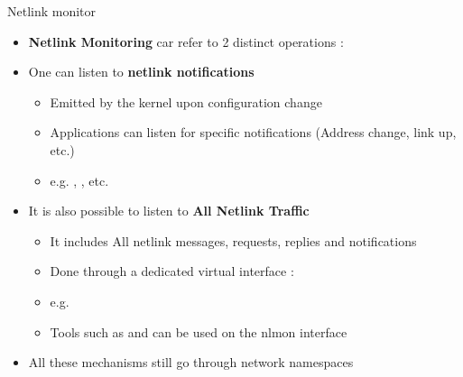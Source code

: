 \begin{frame}{Netlink monitor}
	\begin{itemize}
		\item \textbf{Netlink Monitoring} car refer to 2 distinct operations :
		\item One can listen to \textbf{netlink notifications}
			\begin{itemize}
				\item Emitted by the kernel upon configuration change
				\item Applications can listen for specific notifications (Address change, link up, etc.)
				\item e.g. , , etc.
			\end{itemize}
		\item It is also possible to listen to \textbf{All Netlink Traffic}
			\begin{itemize}
				\item It includes All netlink messages, requests, replies and notifications
				\item Done through a dedicated virtual interface : 
				\item e.g. 
				\item Tools such as  and  can be used on the nlmon interface
			\end{itemize}
		\item All these mechanisms still go through network namespaces
	\end{itemize}
\end{frame}

